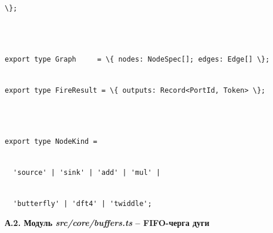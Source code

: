 \documentclass[
]{article}
\newcommand{\passthrough}[1]{#1}
\begin{document}
\passthrough{\lstinline!\};!}\strut \\
\strut \\
\passthrough{\lstinline!export!}\passthrough{\lstinline! !}\passthrough{\lstinline!type!}\passthrough{\lstinline! !}\passthrough{\lstinline!Graph!}\passthrough{\lstinline!     !}\passthrough{\lstinline!=!}\passthrough{\lstinline! !}\passthrough{\lstinline!\{!}\passthrough{\lstinline! !}\passthrough{\lstinline!nodes:!}\passthrough{\lstinline! !}\passthrough{\lstinline!NodeSpec!}\passthrough{\lstinline![];!}\passthrough{\lstinline! !}\passthrough{\lstinline!edges:!}\passthrough{\lstinline! !}\passthrough{\lstinline!Edge[]!}\passthrough{\lstinline! !}\passthrough{\lstinline!\};!}\strut \\
\passthrough{\lstinline!export!}\passthrough{\lstinline! !}\passthrough{\lstinline!type!}\passthrough{\lstinline! !}\passthrough{\lstinline!FireResult!}\passthrough{\lstinline! !}\passthrough{\lstinline!=!}\passthrough{\lstinline! !}\passthrough{\lstinline!\{!}\passthrough{\lstinline! !}\passthrough{\lstinline!outputs:!}\passthrough{\lstinline! !}\passthrough{\lstinline!Record<!}\passthrough{\lstinline!PortId!}\passthrough{\lstinline!,!}\passthrough{\lstinline! !}\passthrough{\lstinline!Token>!}\passthrough{\lstinline! !}\passthrough{\lstinline!\};!}\strut \\
\strut \\
\passthrough{\lstinline!export!}\passthrough{\lstinline! !}\passthrough{\lstinline!type!}\passthrough{\lstinline! !}\passthrough{\lstinline!NodeKind!}\passthrough{\lstinline! !}\passthrough{\lstinline!=!}\strut \\
\passthrough{\lstinline!  !}\passthrough{\lstinline!'source'!}\passthrough{\lstinline! !}\passthrough{\lstinline!|!}\passthrough{\lstinline! !}\passthrough{\lstinline!'sink'!}\passthrough{\lstinline! !}\passthrough{\lstinline!|!}\passthrough{\lstinline! !}\passthrough{\lstinline!'add'!}\passthrough{\lstinline! !}\passthrough{\lstinline!|!}\passthrough{\lstinline! !}\passthrough{\lstinline!'!}\passthrough{\lstinline!mul!}\passthrough{\lstinline!'!}\passthrough{\lstinline! !}\passthrough{\lstinline!|!}\strut \\
\passthrough{\lstinline!  !}\passthrough{\lstinline!'butterfly'!}\passthrough{\lstinline! !}\passthrough{\lstinline!|!}\passthrough{\lstinline! !}\passthrough{\lstinline!'dft4'!}\passthrough{\lstinline! !}\passthrough{\lstinline!|!}\passthrough{\lstinline! !}\passthrough{\lstinline!'twiddle';!}

\textbf{А.2. Модуль \emph{src/core/buffers.ts} -- FIFO-черга дуги}
\end{document}
